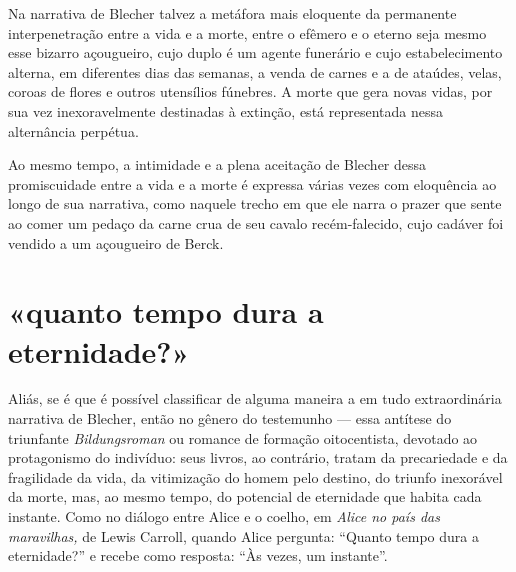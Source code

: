 Na narrativa de Blecher talvez a metáfora mais eloquente da permanente
interpenetração entre a vida e a morte, entre o efêmero e o eterno seja
mesmo esse bizarro açougueiro, cujo duplo é um agente funerário e cujo
estabelecimento alterna, em diferentes dias das semanas, a venda de
carnes e a de ataúdes, velas, coroas de flores e outros utensílios
fúnebres. A morte que gera novas vidas, por sua vez inexoravelmente
destinadas à extinção, está representada nessa alternância perpétua.

Ao mesmo tempo, a intimidade e a plena aceitação de Blecher dessa
promiscuidade entre a vida e a morte é expressa várias vezes com
eloquência ao longo de sua narrativa, como naquele trecho em que ele
narra o prazer que sente ao comer um pedaço da carne crua de seu cavalo
recém-falecido, cujo cadáver foi vendido a um açougueiro de Berck.

\section{«quanto tempo dura a eternidade?»}




Aliás, se é que é possível classificar de alguma maneira a em tudo
extraordinária narrativa de Blecher, então no gênero do testemunho ---
essa antítese do triunfante \emph{Bildungsroman} ou romance de formação
oitocentista, devotado ao protagonismo do indivíduo: seus livros, ao
contrário, tratam da precariedade e da fragilidade da vida, da
vitimização do homem pelo destino, do triunfo inexorável da morte, mas,
ao mesmo tempo, do potencial de eternidade que habita cada instante.
Como no diálogo entre Alice e o coelho, em \emph{Alice no país das
maravilhas,} de Lewis Carroll, quando Alice pergunta: ``Quanto tempo
dura a eternidade?'' e recebe como resposta: ``Às vezes, um instante''.

